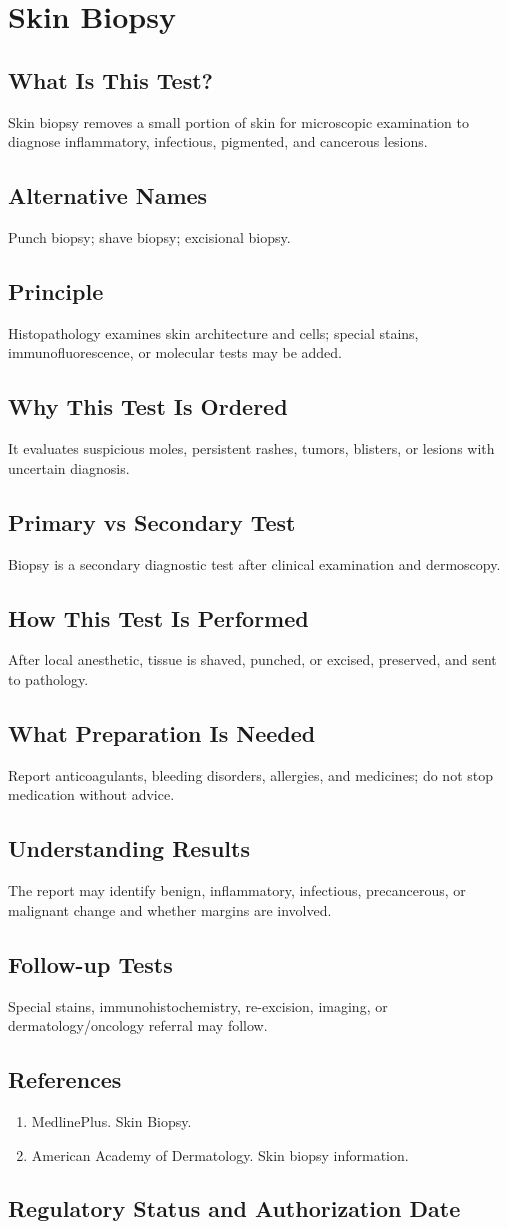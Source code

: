 \chapter{Skin Biopsy}
\section*{What Is This Test?} Skin biopsy removes a small portion of skin for microscopic examination to diagnose inflammatory, infectious, pigmented, and cancerous lesions.\section*{Alternative Names} Punch biopsy; shave biopsy; excisional biopsy.\section*{Principle} Histopathology examines skin architecture and cells; special stains, immunofluorescence, or molecular tests may be added.\section*{Why This Test Is Ordered} It evaluates suspicious moles, persistent rashes, tumors, blisters, or lesions with uncertain diagnosis.\section*{Primary vs Secondary Test} Biopsy is a secondary diagnostic test after clinical examination and dermoscopy.\section*{How This Test Is Performed} After local anesthetic, tissue is shaved, punched, or excised, preserved, and sent to pathology.\section*{What Preparation Is Needed} Report anticoagulants, bleeding disorders, allergies, and medicines; do not stop medication without advice.\section*{Understanding Results} The report may identify benign, inflammatory, infectious, precancerous, or malignant change and whether margins are involved.\section*{Follow-up Tests} Special stains, immunohistochemistry, re-excision, imaging, or dermatology/oncology referral may follow.\section*{References} \begin{enumerate}\item MedlinePlus. Skin Biopsy.\item American Academy of Dermatology. Skin biopsy information.\end{enumerate}\clearpage\section*{Regulatory Status and Authorization Date}\clearpage

